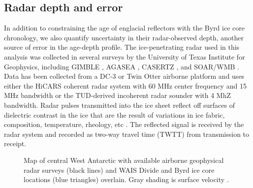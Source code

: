 \subsection{Radar depth and error}
In addition to constraining the age of englacial reflectors with the Byrd ice core chronology, we also quantify uncertainty in their radar-observed depth, another source of error in the age-depth profile. The ice-penetrating radar used in this analysis was collected in several surveys by the University of Texas Institute for Geophysics, including GIMBLE \citep{wais2016}, AGASEA \citep{holt2006}, CASERTZ \citep{morse2002}, and SOAR/WMB \citep{luyendyk2003}. Data has been collected from a DC-3 or Twin Otter airborne platform and uses either the HiCARS coherent radar system with 60 MHz center frequency and 15 MHz bandwidth \citep{peters2005} or the TUD-derived incoherent radar sounder \citep{blankenship2001} with 4 MhZ bandwidth. Radar pulses transmitted into the ice sheet reflect off surfaces of dielectric contrast in the ice that are the result of variations in ice fabric, composition, temperature, rheology, etc \citep{fujita2000}. The reflected signal is received by the radar system and recorded as two-way travel time (TWTT) from transmission to receipt. 


\begin{figure}[h]\label{fig:radarmap}
\centering
{}
\caption{Map of central West Antarctic with available airborne geophysical radar surveys (black lines) and  WAIS Divide and Byrd ice core locations (blue triangles) overlain. Gray shading is surface velocity \citep{rignot2011}. }

\end{figure}



